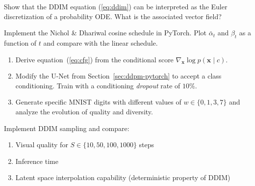 \begin{exercise}
\label{exo:ddim-ode}
Show that the DDIM equation (\ref{eq:ddim}) can be interpreted as
the Euler discretization of a probability ODE. What is the associated
vector field?
\end{exercise}

\begin{exercise}
\label{exo:cosine-schedule}
Implement the Nichol \& Dhariwal cosine schedule in PyTorch.
Plot $\bar{\alpha}_t$ and $\beta_t$ as a function of $t$ and compare
with the linear schedule.
\end{exercise}

\begin{exercise}
\label{exo:cfg}
\begin{enumerate}
    \item Derive equation~(\ref{eq:cfg}) from the conditional score
          $\nabla_{\mathbf{x}} \log p(\mathbf{x} \mid c)$.
    \item Modify the U-Net from Section~\ref{sec:ddpm-pytorch} to accept
          a class conditioning. Train with a conditioning
          \emph{dropout} rate of $10\%$.
    \item Generate specific MNIST digits with different
          values of $w \in \{0, 1, 3, 7\}$ and analyze the evolution
          of quality and diversity.
\end{enumerate}
\end{exercise}

\begin{exercise}
\label{exo:ddpm-vs-ddim}
Implement DDIM sampling and compare:
\begin{enumerate}
    \item Visual quality for $S \in \{10, 50, 100, 1000\}$ steps
    \item Inference time
    \item Latent space interpolation capability (deterministic
          property of DDIM)
\end{enumerate}
\end{exercise}
